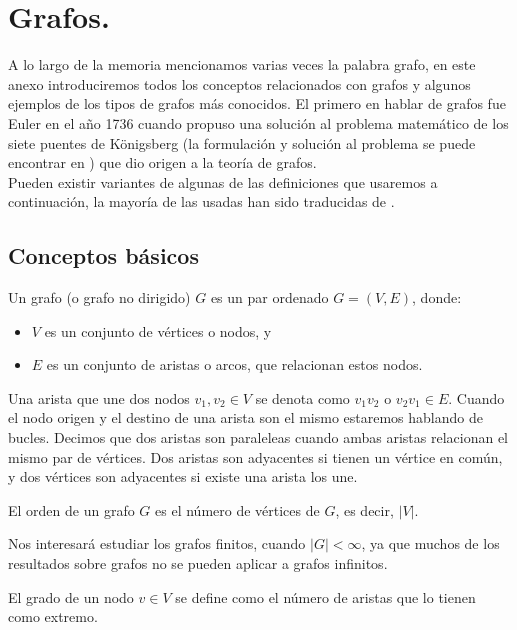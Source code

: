 \chapter{Grafos.}

A lo largo de la memoria mencionamos varias veces la palabra grafo, en este anexo introduciremos todos los conceptos relacionados con grafos y algunos ejemplos de los tipos de grafos más conocidos. El primero en hablar de grafos fue Euler en el año 1736 cuando propuso una solución al problema matemático de los siete puentes de Königsberg (la formulación y solución al problema se puede encontrar en \cite{refpuentes}) que dio origen a la teoría de grafos.\\
Pueden existir variantes de algunas de las definiciones que usaremos a continuación, la mayoría de las usadas han sido traducidas de \cite{librografos}.

\section{Conceptos básicos}

\begin{defi} 
	Un grafo (o grafo no dirigido) $G$ es un par ordenado $G=(V,E)$, donde:
	\begin{itemize}
		\item $V$ es un conjunto de vértices o nodos, y
		\item $E$ es un conjunto de aristas o arcos, que relacionan estos nodos.
	\end{itemize}
\end{defi}

Una arista que une dos nodos $v_{1},v_{2} \in V$ se denota como $v_{1}v_{2}$ o $v_{2}v_{1} \in E$. Cuando el nodo origen y el destino de una arista son el mismo estaremos hablando de bucles. Decimos que dos aristas son paraleleas cuando ambas aristas relacionan el mismo par de vértices. Dos aristas son adyacentes si tienen un vértice en común, y dos vértices son adyacentes si existe una arista los une.

\begin{defi} 
	El orden de un grafo $G$ es el número de vértices de $G$, es decir, $|V|$.
\end{defi}

Nos interesará estudiar los grafos finitos, cuando $|G|< \infty$, ya que muchos de los resultados sobre grafos no se pueden aplicar a grafos infinitos.

\begin{defi} 
	El grado de un nodo $v \in V$ se define como el número de aristas que lo tienen como extremo.
\end{defi}

